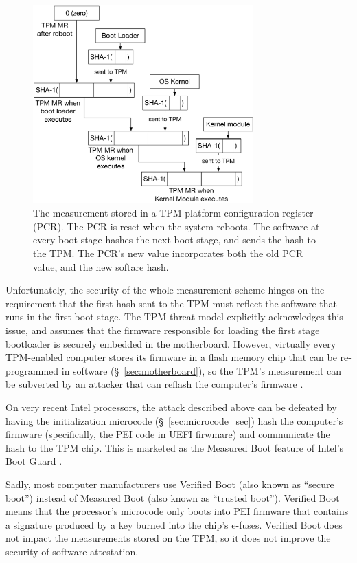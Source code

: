 \begin{figure}[hbt]
  \centering
  \includegraphics[width=85mm]{figures/tpm_measurement.pdf}
  \caption{
    The measurement stored in a TPM platform configuration register (PCR). The
    PCR is reset when the system reboots. The software at every boot stage
    hashes the next boot stage, and sends the hash to the TPM. The PCR's new
    value incorporates both the old PCR value, and the new softare hash.
  }
  \label{fig:tpm_measurement}
\end{figure}

Unfortunately, the security of the whole measurement scheme hinges on the
requirement that the first hash sent to the TPM must reflect the software that
runs in the first boot stage. The TPM threat model explicitly acknowledges this
issue, and assumes that the firmware responsible for loading the first stage
bootloader is securely embedded in the motherboard. However, virtually every
TPM-enabled computer stores its firmware in a flash memory chip that can be
re-programmed in software (\S~\ref{sec:motherboard}), so the TPM's measurement
can be subverted by an attacker that can reflash the computer's firmware
\cite{butterworth2013bios}.

On very recent Intel processors, the attack described above can be defeated by
having the initialization microcode (\S~\ref{sec:microcode_sec}) hash the
computer's firmware (specifically, the PEI code in UEFI \cite{forum2015uefi}
firwmare) and communicate the hash to the TPM chip. This is marketed as the
Measured Boot feature of Intel's Boot Guard \cite{ruan2014intelme}.

Sadly, most computer manufacturers use Verified Boot (also known as ``secure
boot'') instead of Measured Boot (also known as ``trusted boot''). Verified
Boot means that the processor's microcode only boots into PEI firmware that
contains a signature produced by a key burned into the chip's e-fuses. Verified
Boot does not impact the measurements stored on the TPM, so it does not improve
the security of software attestation.

